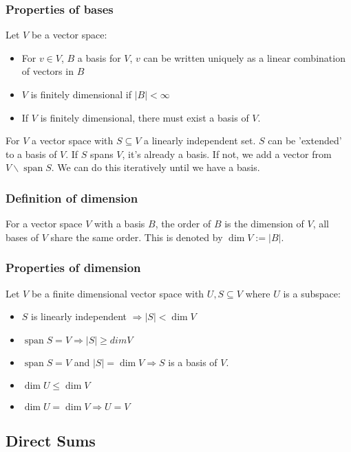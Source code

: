 \documentclass[a4paper, 12pt, twoside]{article}
\DeclareMathOperator{\Spa}{span}
\begin{document}
\subsubsection{Properties of bases}

Let $V$ be a vector space:

\begin{itemize}
  \item For $v \in V$, $B$ a basis for $V$, $v$ can be written uniquely
        as a linear combination of vectors in $B$
  \item $V$ is finitely dimensional if $|B| < \infty$
  \item If $V$ is finitely dimensional, there must exist a basis of $V$.
\end{itemize}

For $V$ a vector space with $S \subseteq V$ a linearly independent set.
$S$ can be 'extended' to a basis of $V$. If $S$ spans $V$, it's
already a basis. If not, we add a vector from $V\backslash\Spa{S}$.
We can do this iteratively until we have a basis.

\subsubsection{Definition of dimension}

For a vector space $V$ with a basis $B$, the order of $B$ is the dimension
of $V$, all bases of $V$ share the same order. This is denoted by
$\dim{V} := |B|$.

\subsubsection{Properties of dimension}

Let $V$ be a finite dimensional vector space with $U, S \subseteq V$
where $U$ is a subspace:

\begin{itemize}
  \item $S$ is linearly independent $\Rightarrow |S| < \dim{V}$
  \item $\Spa{S} = V \Rightarrow |S| \geq dim{V}$
  \item $\Spa{S} = V$ and $|S| = \dim{V}
          \Rightarrow S$ is a basis of $V$.
  \item $\dim{U} \leq \dim{V}$
  \item $\dim{U} = \dim{V} \Rightarrow U = V$
\end{itemize}

\subsection{Direct Sums}
\end{document}
